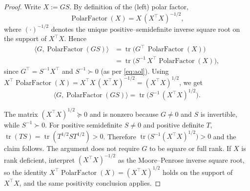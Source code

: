         \begin{proof}
        Write $X:=G S$. By definition of the (left) polar factor,
        \[
            \operatorname{PolarFactor}(X)=X\,(X^\top X)^{-1/2},
        \]
        where $(\cdot)^{-1/2}$ denotes the unique positive–semidefinite inverse square root on the support of $X^\top X$.
        Hence
        \begin{equation*}
        \begin{aligned}
            \langle G,\operatorname{PolarFactor}(G S)\rangle
            &= \operatorname{tr}\!\big(G^\top\,\operatorname{PolarFactor}(X)\big) \\
            &= \operatorname{tr}\!\big(S^{-1}\,X^\top \operatorname{PolarFactor}(X)\big),
        \end{aligned}
        \end{equation*}
        since $G^\top = S^{-1}X^\top$ and $S^{-1}\succ0$ (as per \cref{eq:aol}). Using $X^\top \operatorname{PolarFactor}(X)=X^\top X\,(X^\top X)^{-1/2}=(X^\top X)^{1/2}$, we get
        \[
            \langle G,\operatorname{PolarFactor}(GS)\rangle
            = \operatorname{tr}\!\big(S^{-1}\,(X^\top X)^{1/2}\big).
        \]
        
        The matrix $(X^\top X)^{1/2}\succeq0$ and is nonzero because $G\neq0$ and $S$ is invertible, while $S^{-1}\succ0$. For positive semidefinite $S\neq0$ and positive definite $T$, $\operatorname{tr}(TS)=\operatorname{tr}(T^{1/2}ST^{1/2})>0$. Therefore $\operatorname{tr}\!\big(S^{-1}(X^\top X)^{1/2}\big)>0$ and the claim follows.
        The argument does not require $G$ to be square or full rank. If $X$ is rank deficient, interpret $(X^\top X)^{-1/2}$ as the Moore–Penrose inverse square root, so the identity $X^\top \operatorname{PolarFactor}(X)=(X^\top X)^{1/2}$ holds on the support of $X^\top X$, and the same positivity conclusion applies.
        \end{proof}
    
    
        
